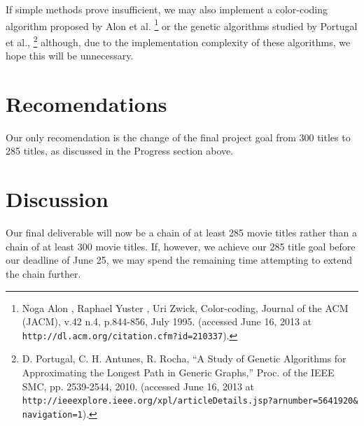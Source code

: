 \documentclass[11pt,english]{article}
\begin{document}
If simple methods prove insufficient, we may also implement a color-coding
algorithm proposed by Alon et al.\hspace{-0.2cm}
\footnote{Noga Alon , Raphael Yuster , Uri Zwick, Color-coding, Journal of the
ACM (JACM), v.42 n.4, p.844-856, July 1995. (accessed June 16, 2013 at
\texttt{http://dl.acm.org/citation.cfm?id=210337}).}
or the genetic algorithms studied by Portugal et al.,\hspace{-0.2cm}
\footnote{
D. Portugal, C. H. Antunes, R. Rocha, ``A Study of Genetic Algorithms for
Approximating the Longest Path in Generic Graphs,'' Proc. of the IEEE SMC, pp.
2539-2544, 2010. (accessed June 16, 2013 at
\texttt{http://ieeexplore.ieee.org/xpl/articleDetails.jsp?arnumber=5641920\&
navigation=1}).}
although, due to the implementation complexity of these algorithms, we hope
this will be unnecessary.

\section{Recomendations}
Our only recomendation is the change of the final project goal from 300 titles
to 285 titles, as discussed in the Progress section above.

\section{Discussion}
Our final deliverable will now be a chain of at least 285 movie titles rather
than a chain of at least 300 movie titles. If, however, we achieve our 285
title goal before our deadline of June 25, we may spend the remaining time
attempting to extend the chain further.
\end{document}
